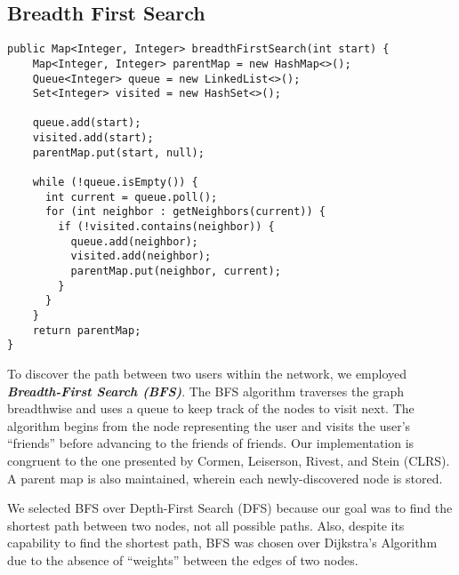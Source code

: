 \subsection*{\textbf{Breadth First Search}}
\begin{lstlisting}
public Map<Integer, Integer> breadthFirstSearch(int start) {
    Map<Integer, Integer> parentMap = new HashMap<>();
    Queue<Integer> queue = new LinkedList<>();
    Set<Integer> visited = new HashSet<>();

    queue.add(start);
    visited.add(start);
    parentMap.put(start, null); 

    while (!queue.isEmpty()) {
      int current = queue.poll();
      for (int neighbor : getNeighbors(current)) {
        if (!visited.contains(neighbor)) {
          queue.add(neighbor);
          visited.add(neighbor);
          parentMap.put(neighbor, current);
        }
      }
    }
    return parentMap;
}
\end{lstlisting}
To discover the path between two users within the network, we employed \textit{\textbf{Breadth-First Search (BFS)}}. The BFS algorithm traverses the graph breadthwise and uses a queue to keep track of the nodes to visit next. The algorithm begins from the node representing the user and visits the user’s “friends” before advancing to the friends of friends. Our implementation is congruent to the one presented by Cormen, Leiserson, Rivest, and Stein (CLRS)\cite{cormen2001introduction}. A parent map is also maintained, wherein each newly-discovered node is stored. 

We selected BFS over Depth-First Search (DFS) because our goal was to find the shortest path between two nodes, not all possible paths. Also, despite its capability to find the shortest path, BFS was chosen over Dijkstra’s Algorithm due to the absence of “weights” between the edges of two nodes.\cite{sedgewick2011algorithms}

